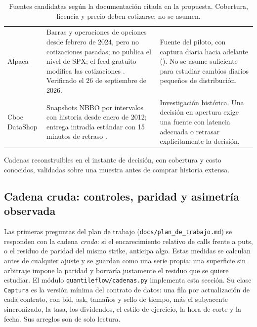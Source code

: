 \begin{table}[H]
\centering\small
\caption{Fuentes candidatas según la documentación citada en la propuesta. Cobertura, licencia y precio
deben cotizarse; no se asumen.}
\label{tab:fuentes}
\begin{tabularx}{\linewidth}{@{}l Y Y@{}}
\toprule
{} &  & \\
\midrule
Alpaca & Barras y operaciones de opciones desde febrero de 2024, pero no cotizaciones pasadas; no publica
el nivel de SPX; el feed gratuito modifica las cotizaciones \citep{alpaca}. Verificado el 26 de septiembre
de 2026. & Fuente del piloto, con captura diaria hacia adelante (). No se asume
suficiente para estudiar cambios diarios pequeños de distribución.\\
Cboe DataShop & Snapshots NBBO por intervalos con historia desde enero de 2012; entrega intradía estándar
con 15 minutos de retraso \citep{cboe}. & Investigación histórica. Una decisión en apertura exige una
fuente con latencia adecuada o retrasar explícitamente la decisión.\\
\bottomrule
\end{tabularx}
\end{table}

\begin{criterio}
Cadenas reconstruibles en el instante de decisión, con cobertura y costo conocidos, validadas sobre una
muestra antes de comprar historia extensa.
\end{criterio}

\subsection{Cadena cruda: controles, paridad y asimetría observada}\label{sec:cadena_cruda}

Las primeras preguntas del plan de trabajo (\texttt{docs/plan\_de\_trabajo.md}) se responden con la cadena
\emph{cruda}: si el encarecimiento relativo de calls frente a puts, o el residuo de paridad del mismo
strike, anticipa algo. Estas medidas se calculan antes de cualquier ajuste y se guardan como una serie
propia: una superficie sin arbitraje impone la paridad y borraría justamente el residuo que se quiere
estudiar. El módulo \texttt{quantileflow/cadenas.py} implementa esta sección. Su clase \texttt{Captura} es
la versión mínima del contrato de datos: una fila por actualización de cada contrato, con bid, ask,
tamaños y sello de tiempo, más el subyacente sincronizado, la tasa, los dividendos, el estilo de
ejercicio, la hora de corte y la fecha. Sus arreglos son de solo lectura.

